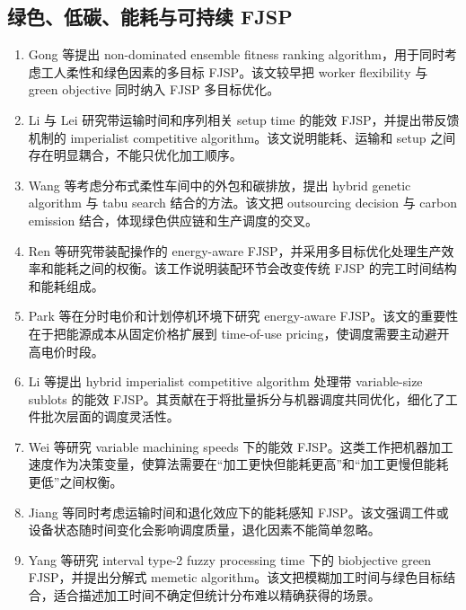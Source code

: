 \documentclass[UTF8,a4paper,11pt]{ctexart}
\begin{document}
\subsection{绿色、低碳、能耗与可持续 FJSP}

\begin{enumerate}[label=\textbf{G\arabic*.},leftmargin=3em]
\item Gong 等提出 non-dominated ensemble fitness ranking algorithm，用于同时考虑工人柔性和绿色因素的多目标 FJSP\cite{Gong2021Green}。该文较早把 worker flexibility 与 green objective 同时纳入 FJSP 多目标优化。

\item Li 与 Lei 研究带运输时间和序列相关 setup time 的能效 FJSP，并提出带反馈机制的 imperialist competitive algorithm\cite{Li2021EnergyTransport}。该文说明能耗、运输和 setup 之间存在明显耦合，不能只优化加工顺序。

\item Wang 等考虑分布式柔性车间中的外包和碳排放，提出 hybrid genetic algorithm 与 tabu search 结合的方法\cite{Wang2021OutsourcingCarbon}。该文把 outsourcing decision 与 carbon emission 结合，体现绿色供应链和生产调度的交叉。

\item Ren 等研究带装配操作的 energy-aware FJSP，并采用多目标优化处理生产效率和能耗之间的权衡\cite{Ren2021AssemblyEnergy}。该工作说明装配环节会改变传统 FJSP 的完工时间结构和能耗组成。

\item Park 等在分时电价和计划停机环境下研究 energy-aware FJSP\cite{Park2022TOU}。该文的重要性在于把能源成本从固定价格扩展到 time-of-use pricing，使调度需要主动避开高电价时段。

\item Li 等提出 hybrid imperialist competitive algorithm 处理带 variable-size sublots 的能效 FJSP\cite{Li2022Imperialist}。其贡献在于将批量拆分与机器调度共同优化，细化了工件批次层面的调度灵活性。

\item Wei 等研究 variable machining speeds 下的能效 FJSP\cite{Wei2022EnergySpeed}。这类工作把机器加工速度作为决策变量，使算法需要在“加工更快但能耗更高”和“加工更慢但能耗更低”之间权衡。

\item Jiang 等同时考虑运输时间和退化效应下的能耗感知 FJSP\cite{Jiang2022Deterioration}。该文强调工件或设备状态随时间变化会影响调度质量，退化因素不能简单忽略。

\item Yang 等研究 interval type-2 fuzzy processing time 下的 biobjective green FJSP，并提出分解式 memetic algorithm\cite{Yang2023FuzzyGreen}。该文把模糊加工时间与绿色目标结合，适合描述加工时间不确定但统计分布难以精确获得的场景。


\end{enumerate}
\end{document}
